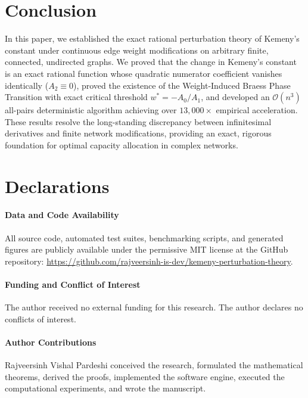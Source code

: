 \documentclass[11pt,a4paper]{article}
\theoremstyle{plain}
\theoremstyle{definition}
\begin{document}
\section{Conclusion}
\label{sec:conclusion}

In this paper, we established the exact rational perturbation theory of Kemeny's constant under continuous edge weight modifications on arbitrary finite, connected, undirected graphs. We proved that the change in Kemeny's constant is an exact rational function whose quadratic numerator coefficient vanishes identically ($A_2 \equiv 0$), proved the existence of the Weight-Induced Braess Phase Transition with exact critical threshold $w^* = -A_0 / A_1$, and developed an $\mathcal{O}(n^3)$ all-pairs deterministic algorithm achieving over $13,000\times$ empirical acceleration. These results resolve the long-standing discrepancy between infinitesimal derivatives and finite network modifications, providing an exact, rigorous foundation for optimal capacity allocation in complex networks.

\section*{Declarations}

\paragraph{Data and Code Availability}
All source code, automated test suites, benchmarking scripts, and generated figures are publicly available under the permissive MIT license at the GitHub repository: \url{https://github.com/rajveersinh-is-dev/kemeny-perturbation-theory}.

\paragraph{Funding and Conflict of Interest}
The author received no external funding for this research. The author declares no conflicts of interest.

\paragraph{Author Contributions}
Rajveersinh Vishal Pardeshi conceived the research, formulated the mathematical theorems, derived the proofs, implemented the software engine, executed the computational experiments, and wrote the manuscript.



\end{document}
